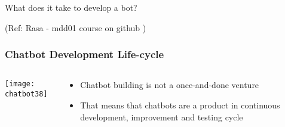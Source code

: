 \begin{frame}[fragile]\frametitle{}
\begin{center}
{\Large What does it take to develop a bot?}
\end{center}

{\tiny (Ref: Rasa - mdd01 course on github )}

\end{frame}

\begin{frame}[fragile]\frametitle{Chatbot Development Life-cycle}

    \begin{columns}
    \begin{column}[t]{0.5\linewidth}
\begin{center}
\texttt{[image: chatbot38]}
\end{center}
\end{column}
    \begin{column}[t]{0.5\linewidth}
\begin{itemize}
\item Chatbot building is not a once-and-done venture
\item That means that chatbots are a product in continuous development, improvement and testing cycle
\end{itemize}
\end{column}
\end{columns}
\end{frame}

